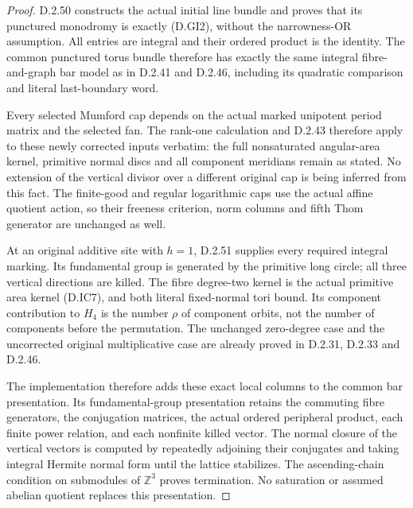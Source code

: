 \begin{proof}
D.2.50 constructs the actual initial line bundle
and proves that its punctured monodromy is exactly
(D.GI2), without the narrowness-OR assumption.
All entries are integral and their ordered product
is the identity. The common punctured torus bundle
therefore has exactly the same integral fibre-and-graph
bar model as in D.2.41 and D.2.46, including its
quadratic comparison and literal last-boundary word.

Every selected Mumford cap depends on the actual
marked unipotent period matrix and the selected fan.
The rank-one calculation and D.2.43 therefore apply
to these newly corrected inputs verbatim: the full
nonsaturated angular-area kernel, primitive normal
discs and all component meridians remain as stated.
No extension of the vertical divisor over a different
original cap is being inferred from this fact.
The finite-good and regular logarithmic caps use
the actual affine quotient action, so their freeness
criterion, norm columns and fifth Thom generator
are unchanged as well.

At an original additive site with $h=1$, D.2.51
supplies every required integral marking. Its
fundamental group is generated by the primitive
long circle; all three vertical directions are
killed. The fibre degree-two kernel is the actual
primitive area kernel (D.IC7), and both literal
fixed-normal tori bound. Its component contribution
to $H_4$ is the number $\rho$ of component orbits,
not the number of components before the permutation.
The unchanged zero-degree case and the uncorrected
original multiplicative case are already proved
in D.2.31, D.2.33 and D.2.46.

The implementation therefore adds these exact
local columns to the common bar presentation.
Its fundamental-group presentation retains the
commuting fibre generators, the conjugation matrices,
the actual ordered peripheral product, each finite
power relation, and each nonfinite killed vector.
The normal closure of the vertical vectors is
computed by repeatedly adjoining their conjugates
and taking integral Hermite normal form until the
lattice stabilizes. The ascending-chain condition
on submodules of $\mathbb Z^3$ proves termination.
No saturation or assumed abelian quotient replaces
this presentation.


\end{proof}

